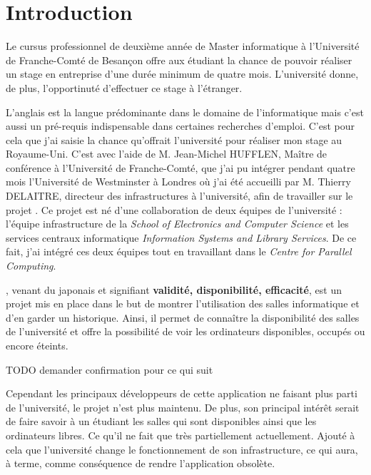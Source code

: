 \chapter{Introduction}

Le cursus professionnel de deuxi\`eme ann\'ee de Master informatique \`a l'Universit\'e de Franche-Comt\'e de Besan\c{c}on offre aux \'etudiant la chance de pouvoir r\'ealiser un stage en entreprise d'une dur\'ee minimum de quatre mois. 
L'universit\'e donne, de plus, l'opportinut\'e d'effectuer ce stage \`a l'\'etranger.

L'anglais est la langue pr\'edominante dans le domaine de l'informatique mais c'est aussi un pr\'e-requis indispensable dans certaines recherches d'emploi.
C'est pour cela que j'ai saisie la chance qu'offrait l'universit\'e pour r\'ealiser mon stage au Royaume-Uni. 
C'est avec l'aide de M. Jean-Michel HUFFLEN, Ma\^itre de conf\'erence \`a l'Universit\'e de Franche-Comt\'e, que j'ai pu int\'egrer pendant quatre mois l'Universit\'e de Westminster \`a Londres o\`u j'ai \'et\'e accueilli par M. Thierry DELAITRE, directeur des infrastructures \`a l'universit\'e, afin de travailler sur le projet \YuukouII.
Ce projet est n\'e d'une collaboration de deux \'equipes de l'universit\'e : l'\'equipe infrastructure de la \textit{School of Electronics and Computer Science} et les services centraux informatique \textit{Information Systems and Library Services}. 
De ce fait, j'ai int\'egr\'e ces deux \'equipes tout en travaillant dans le \textit{Centre for Parallel Computing}.

\Yuukou, venant du japonais et signifiant \textbf{validit\'e, disponibilit\'e, efficacit\'e}, est un projet mis en place dans le but de montrer l'utilisation des salles informatique et d'en garder un historique.
Ainsi, il permet de conna\^itre la disponibilit\'e des salles de l'universit\'e et offre la possibilit\'e de voir les ordinateurs disponibles, occup\'es ou encore \'eteints.

TODO demander confirmation pour ce qui suit

Cependant les principaux d\'eveloppeurs de cette application ne faisant plus parti de l'universit\'e, le projet n'est plus maintenu.
De plus, son principal int\'er\^et serait de faire savoir \`a un \'etudiant les salles qui sont disponibles ainsi que les ordinateurs libres.
Ce qu'il ne fait que tr\`es partiellement actuellement.
Ajout\'e \`a cela que l'universit\'e change le fonctionnement de son infrastructure, ce qui aura, \`a terme, comme cons\'equence de rendre l'application obsol\`ete.

